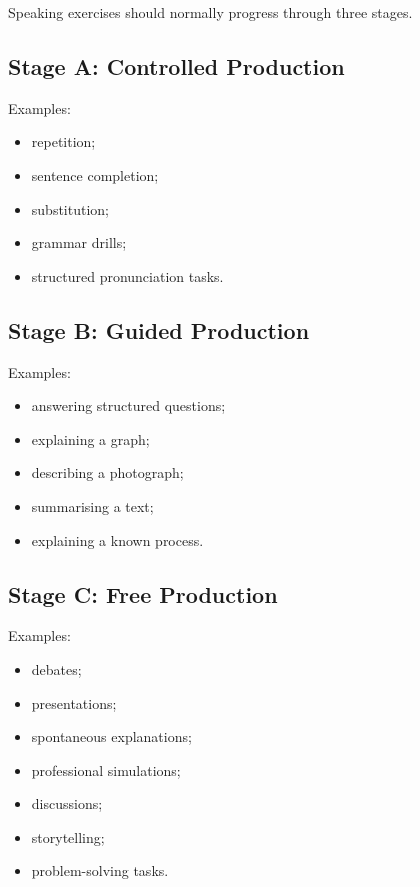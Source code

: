 Speaking exercises should normally progress through three stages.

\subsection*{Stage A: Controlled Production}

Examples:

\begin{itemize}
    \item repetition;
    \item sentence completion;
    \item substitution;
    \item grammar drills;
    \item structured pronunciation tasks.
\end{itemize}

\subsection*{Stage B: Guided Production}

Examples:

\begin{itemize}
    \item answering structured questions;
    \item explaining a graph;
    \item describing a photograph;
    \item summarising a text;
    \item explaining a known process.
\end{itemize}

\subsection*{Stage C: Free Production}

Examples:

\begin{itemize}
    \item debates;
    \item presentations;
    \item spontaneous explanations;
    \item professional simulations;
    \item discussions;
    \item storytelling;
    \item problem-solving tasks.
\end{itemize}

